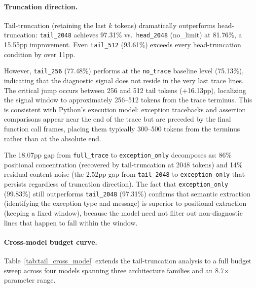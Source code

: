 \paragraph{Truncation direction.}
Tail-truncation (retaining the last $k$ tokens) dramatically outperforms head-truncation: \texttt{tail\_2048} achieves 97.31\% vs.\ \texttt{head\_2048} (no\_limit) at 81.76\%, a 15.55pp improvement.
Even \texttt{tail\_512} (93.61\%) exceeds every head-truncation condition by over 11pp.

However, \texttt{tail\_256} (77.48\%) performs at the \texttt{no\_trace} baseline level (75.13\%), indicating that the diagnostic signal does not reside in the very last trace lines.
The critical jump occurs between 256 and 512 tail tokens (+16.13pp), localizing the signal window to approximately 256--512 tokens from the trace terminus.
This is consistent with Python's execution model: exception tracebacks and assertion comparisons appear near the end of the trace but are preceded by the final function call frames, placing them typically 300--500 tokens from the terminus rather than at the absolute end.

The 18.07pp gap from \texttt{full\_trace} to \texttt{exception\_only} decomposes as: 86\% positional concentration (recovered by tail-truncation at 2048 tokens) and 14\% residual content noise (the 2.52pp gap from \texttt{tail\_2048} to \texttt{exception\_only} that persists regardless of truncation direction).
The fact that \texttt{exception\_only} (99.83\%) still outperforms \texttt{tail\_2048} (97.31\%) confirms that semantic extraction (identifying the exception type and message) is superior to positional extraction (keeping a fixed window), because the model need not filter out non-diagnostic lines that happen to fall within the window.

\paragraph{Cross-model budget curve.}
Table~\ref{tab:tail_cross_model} extends the tail-truncation analysis to a full budget sweep across four models spanning three architecture families and an 8.7$\times$ parameter range.

